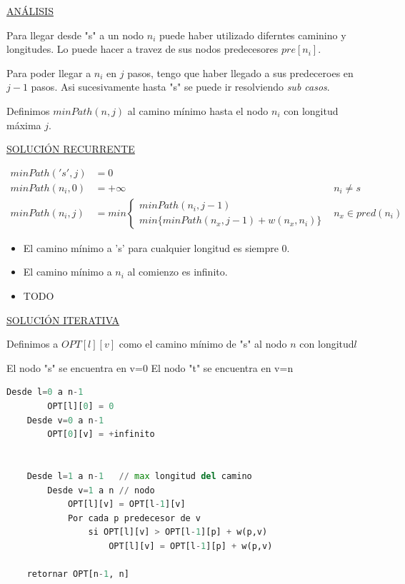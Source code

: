 \documentclass{article}
\begin{document}
\underline{ANÁLISIS}

Para llegar desde "s" a un nodo \(n_i\) puede haber utilizado diferntes caminino y longitudes.
Lo puede hacer a travez de sus nodos predecesores \(pre[n_i]\).

Para poder llegar a \(n_i\) en \(j\) pasos, tengo que haber llegado a sus predeceroes en \(j-1\) pasos. 
Asi sucesivamente hasta "s" se puede ir resolviendo \textit{sub casos}.

Definimos \(minPath(n,j)\) al camino mínimo hasta el nodo \(n_i\) con longitud máxima \(j\).

\underline{SOLUCIÓN RECURRENTE}

\begin{align*}
minPath('s', j) &= 0 \\
minPath(n_i, 0) &= +\infty & n_i \neq s \\
minPath(n_i, j) &=min\left\{\begin{array}{ll}
                minPath(n_i, j-1)              \\
                min \{minPath(n_x, j-1) + w(n_x, n_i)\}          
        \end{array}\right. & n_x \in pred(n_i)
\end{align*}

\begin{itemize}
    \item El camino mínimo a 's' para cualquier longitud es siempre 0.
    \item El camino mínimo a \(n_i\) al comienzo es infinito.
    \item TODO
\end{itemize}

\underline{SOLUCIÓN ITERATIVA}

Definimos a \(OPT[l][v]\) como el camino mínimo de "s" al nodo \(n\) con longitud\(l\)

El nodo "s" se encuentra en v=0
El nodo "t" se encuentra en v=n

\begin{lstlisting}[language=Python, caption=Algoritmo de requeridos con cupos]
    Desde l=0 a n-1
        OPT[l][0] = 0
    Desde v=0 a n-1
        OPT[0][v] = +infinito


    Desde l=1 a n-1   // max longitud del camino
        Desde v=1 a n // nodo
            OPT[l][v] = OPT[l-1][v]
            Por cada p predecesor de v
                si OPT[l][v] > OPT[l-1][p] + w(p,v)
                    OPT[l][v] = OPT[l-1][p] + w(p,v)
                   
    retornar OPT[n-1, n]
\end{lstlisting}
\end{document}

